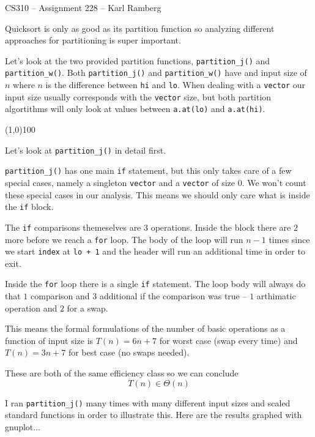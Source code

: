 \documentclass[11pt]{article}
\begin{document}
\thispagestyle{empty}

\begin{center}
CS310 -- Assignment 228 -- Karl Ramberg
\end{center}

Quicksort is only as good as its partition function so analyzing different
approaches for partitioning is super important.

Let's look at the two provided partition functions, \texttt{partition\_j()}
and \texttt{partition\_w()}. Both \texttt{partition\_j()} and
\texttt{partition\_w()} have and input size of $n$ where $n$ is the difference
between \texttt{hi} and \texttt{lo}. When dealing with a \texttt{vector} our
input size usually corresponds with the \texttt{vector} size, but both
partition algortithms will only look at values between \texttt{a.at(lo)} and
\texttt{a.at(hi)}.

\begin{center}
\line(1,0){100}
\end{center}

Let's look at \texttt{partition\_j()} in detail first.

\texttt{partition\_j()} has one main \texttt{if} statement, but this only takes care of
a few special cases, namely a singleton \texttt{vector} and a \texttt{vector}
of size $0$. We won't count these special cases in our analysis. This means
we should only care what is inside the \texttt{if} block.

The \texttt{if} comparisons themeselves are $3$ operations. Inside the block
there are $2$ more before we reach a \texttt{for} loop. The body of the loop
will run $n-1$ times since we start \texttt{index} at \texttt{lo + 1} and the
header will run an additional time in order to exit.

Inside the \texttt{for} loop there is a single \texttt{if} statement. The loop
body will always do that $1$ comparison and $3$ additional if the comparison
was true -- $1$ arthimatic operation and $2$ for a swap.

This means the formal formulations of the number of basic operations as a
function of input size is $T(n) = 6n + 7$ for worst case (swap every time) and
$T(n) = 3n + 7$ for best case (no swaps needed).

These are both of the same efficiency class so we can conclude
\[
T(n) \in \Theta(n)
\]

I ran \texttt{partition\_j()} many times with many different input sizes  and
scaled standard functions in order to illustrate this. Here are the results
graphed with gnuplot...
\end{document}

